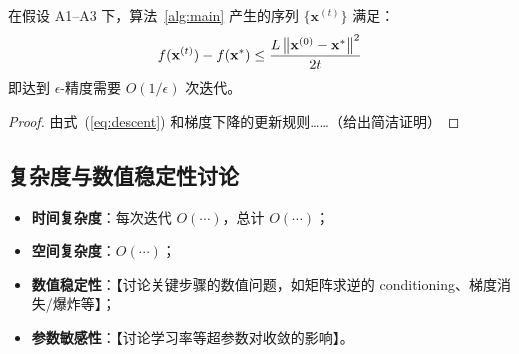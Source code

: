 \begin{theorem}[收敛性]\label{thm:convergence}
    在假设 A1--A3 下，算法~\ref{alg:main} 产生的序列 $\{\mathbf{x}^{(t)}\}$ 满足：
    \begin{equation}
        f(\mathbf{x}^{(t)}) - f(\mathbf{x}^*) \leq \frac{L \left\lVert\mathbf{x}^{(0)} - \mathbf{x}^*\right\rVert^2}{2t}
    \end{equation}
    即达到 $\epsilon$-精度需要 $O(1/\epsilon)$ 次迭代。
\end{theorem}

\begin{proof}
    由式~(\ref{eq:descent}) 和梯度下降的更新规则……（给出简洁证明）
\end{proof}

\subsection{复杂度与数值稳定性讨论}

\begin{itemize}
    \item \textbf{时间复杂度}：每次迭代 $O(\cdots)$，总计 $O(\cdots)$；
    \item \textbf{空间复杂度}：$O(\cdots)$；
    \item \textbf{数值稳定性}：【讨论关键步骤的数值问题，如矩阵求逆的 conditioning、梯度消失/爆炸等】；
    \item \textbf{参数敏感性}：【讨论学习率等超参数对收敛的影响】。
\end{itemize}
